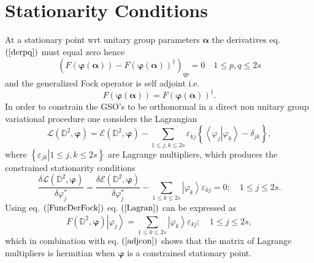 \documentclass[aps,preprint]{revtex4}%
\begin{document}
\section{Stationarity Conditions\label{StatCon}}

At a stationary point wrt unitary group parameters $\mathbf{\alpha}$ the
derivatives eq. $\left(  \ref{derpq}\right)  $ must equal zero hence
\begin{equation}
\left(  F\left(  \mathbf{\varphi}\left(  \mathbf{\alpha}\right)  \right)
-F\left(  \mathbf{\varphi}\left(  \mathbf{\alpha}\right)  \right)  ^{\dagger
}\right)  _{qp}=0\quad1\leq p,q\leq2s
\end{equation}
and the generalized Fock operator is self adjoint i.e.
\begin{equation}
F\left(  \mathbf{\varphi}\left(  \mathbf{\alpha}\right)  \right)  =F\left(
\mathbf{\varphi}\left(  \mathbf{\alpha}\right)  \right)  ^{\dagger
}.\label{adjcon}%
\end{equation}
In order to constrain the GSO's to be orthonormal in a direct non unitary
group variational procedure one considers the Lagrangian
\begin{equation}
\mathcal{L}\left(  \mathbb{D}^{2},\mathbf{\varphi}\right)  =\mathcal{E}\left(
\mathbb{D}^{2},\mathbf{\varphi}\right)  -\sum_{1\leq j,k\leq2s}\varepsilon
_{kj}\left\{  \left\langle \left.  \varphi_{j}\right\vert \varphi
_{k}\right\rangle -\delta_{jk}\right\}  ,
\end{equation}
where $\left\{  \left.  \varepsilon_{jk}\right\vert 1\leq j,k\leq2s\right\}  $
are Lagrange multipliers, which produces the constrained stationarity
conditions
\begin{equation}
\frac{\delta\mathcal{L}\left(  \mathbb{D}^{2},\mathbf{\varphi}\right)
}{\delta\varphi_{j}^{\ast}}=\frac{\delta\mathcal{E}\left(  \mathbb{D}%
^{2},\mathbf{\varphi}\right)  }{\delta\varphi_{j}^{\ast}}-\sum_{1\leq k\leq
2s}\left\vert \varphi_{k}\right\rangle \varepsilon_{kj}=0;\quad1\leq
j\leq2s.\label{Lagran}%
\end{equation}
Using eq. $\left(  \ref{FuncDerFock}\right)  $ eq. $\left(  \ref{Lagran}%
\right)  $ can be expressed as
\begin{equation}
F\left(  \mathbb{D}^{2},\mathbf{\varphi}\right)  \left\vert \varphi
_{j}\right\rangle =\sum_{1\leq k\leq2s}\left\vert \varphi_{k}\right\rangle
\varepsilon_{kj};\quad1\leq j\leq2s,
\end{equation}
which in combination with eq. $\left(  \ref{adjcon}\right)  $ shows that the
matrix of Lagrange multipliers is hermitian when $\mathbf{\varphi}$ is a
constrained stationary point.
\end{document}
